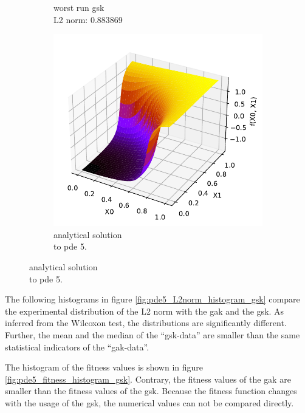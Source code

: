 \documentclass[./\jobname.tex]{subfiles}
\begin{document}
\begin{figure}[H]
\begin{subfigure}[b]{0.3333\linewidth}
		\caption{worst run \gls{gsk} \\L2 norm: 0.883869}
		\label{fig:pde5_ex3_best_solution_adaptive}
	\end{subfigure}%
	\begin{subfigure}[b]{0.3333\linewidth}
		\centering
		\includegraphics[width=1\textwidth]{../../code/testbed/pde5/sol_pde_5.pdf}
		\caption{analytical solution \\to \gls{pde} 5.}
		\label{fig:pde5_analytical_solution_3}
	\end{subfigure}%
	\label{fig:pde5_ex3_compare_best_worst}
\end{figure}

The following histograms in figure \ref{fig:pde5_L2norm_histogram_gsk} compare the experimental distribution of the L2 norm with the \gls{gak} and the \gls{gsk}. As inferred from the Wilcoxon test, the distributions are significantly different. Further, the mean and the median of the ``\gls{gsk}-data'' are smaller than the same statistical indicators of the ``\gls{gak}-data''. 

The histogram of the fitness values is shown in figure \ref{fig:pde5_fitness_histogram_gsk}. Contrary, the fitness values of the \gls{gak} are smaller than the fitness values of the \gls{gsk}. Because the fitness function changes with the usage of the \gls{gsk}, the numerical values can not be compared directly. 
\end{document}

